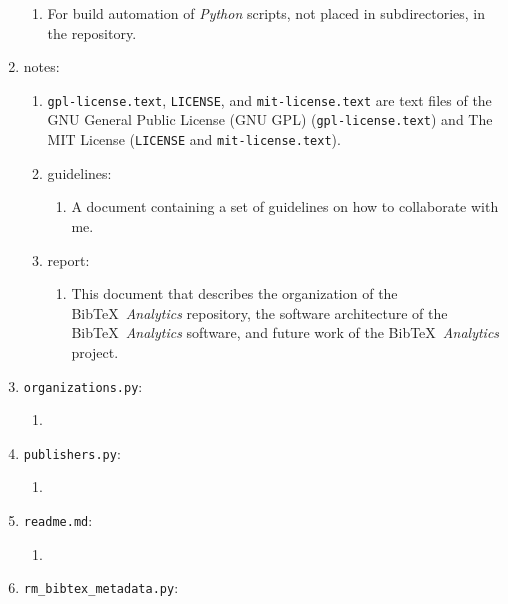 \begin{enumerate}
	\begin{enumerate} \itemsep -2pt
	\item For build automation of {\it Python} scripts, not placed in subdirectories, in the repository.
	\end{enumerate}
\item notes: \vspace{-0.3cm}
	\begin{enumerate} \itemsep -2pt
	\item {\tt gpl-license.text}, {\tt LICENSE}, and {\tt mit-license.text} are text files of the GNU General Public License (GNU GPL) ({\tt gpl-license.text}) and The MIT License ({\tt LICENSE} and {\tt mit-license.text}).
	\item guidelines: \vspace{-0.2cm}
		\begin{enumerate} \itemsep -2pt
		\item A document containing a set of guidelines on how to collaborate with me.
		\end{enumerate}
	\item report: \vspace{-0.2cm}
		\begin{enumerate} \itemsep -2pt
		\item This document that describes the organization of the {\sc Bib}\TeX\ {\it Analytics} repository, the software architecture of the {\sc Bib}\TeX\ {\it Analytics} software, and future work of the {\sc Bib}\TeX\ {\it Analytics} project.
		\end{enumerate}
	\end{enumerate}
\item {\tt organizations.py}: \vspace{-0.3cm}
	\begin{enumerate} \itemsep -2pt
	\item 
	\end{enumerate}
\item {\tt publishers.py}: \vspace{-0.3cm}
	\begin{enumerate} \itemsep -2pt
	\item 
	\end{enumerate}
\item {\tt readme.md}: \vspace{-0.3cm}
	\begin{enumerate} \itemsep -2pt
	\item 
	\end{enumerate}
\item {\tt rm\_bibtex\_metadata.py}: \vspace{-0.3cm}

\end{enumerate}
